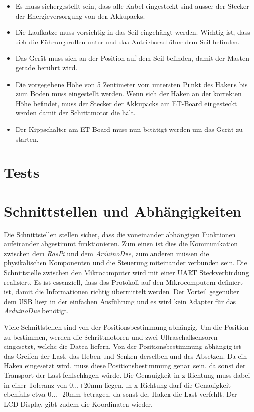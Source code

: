\documentclass[a4paper]{report}
\begin{document}
\begin{itemize}
	\item Es muss sichergestellt sein, dass alle Kabel eingesteckt sind ausser der Stecker der Energieversorgung von den Akkupacks.
	\item Die Laufkatze muss vorsichtig in das Seil eingehängt werden. Wichtig ist, dass sich die Führungsrollen unter und das Antriebsrad über dem Seil befinden.
	\item Das Gerät muss sich an der Position auf dem Seil befinden, damit der Masten gerade berührt wird.
	\item Die vorgegebene Höhe von 5 Zentimeter vom untersten Punkt des Hakens bis zum Boden muss eingestellt werden. Wenn sich der Haken an der korrekten Höhe befindet, muss der Stecker der Akkupacks am ET-Board eingesteckt werden damit der Schrittmotor die hält.
	\item Der Kippschalter am ET-Board muss nun betätigt werden um das Gerät zu starten.
\end{itemize}

\section{Tests}
\label{sec:TestsPrototyp}

\section{Schnittstellen und Abhängigkeiten}
\label{sec:SchnittAbhang}

Die Schnittstellen stellen sicher, dass die voneinander abhängigen Funktionen aufeinander abgestimmt funktionieren. Zum einen ist dies die Kommunikation zwischen dem \textit{RasPi} und dem \textit{ArduinoDue}, zum anderen müssen die physikalischen Komponenten und die Steuerung miteinander verbunden sein. Die Schnittstelle zwischen den Mikrocomputer wird mit einer UART Steckverbindung realisiert. Es ist essenziell, dass das Protokoll auf den Mikrocomputern definiert ist, damit die Informationen richtig übermittelt werden. Der Vorteil gegenüber dem USB liegt in der einfachen Ausführung und es wird kein Adapter für das \textit{ArduinoDue} benötigt.

Viele Schnittstellen sind von der Positionsbestimmung abhängig. Um die Position zu bestimmen, werden die Schrittmotoren und zwei Ultraschallsensoren eingesetzt, welche die Daten liefern. Von der Positionsbestimmung abhängig ist das Greifen der Last, das Heben und Senken derselben und das Absetzen. Da ein Haken eingesetzt wird, muss diese Positionsbestimmung genau sein, da sonst der Transport der Last fehlschlagen würde. Die Genauigkeit in z-Richtung muss dabei in einer Toleranz von 0...+20mm liegen. In x-Richtung darf die Genauigkeit ebenfalls etwa 0...+20mm betragen, da sonst der Haken die Last verfehlt. Der LCD-Display gibt zudem die Koordinaten wieder.
\end{document}
